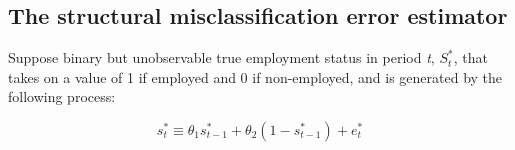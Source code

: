 \documentclass[letterpaper,12pt,final,dvipsnames]{article}
\begin{document}




\subsection{The structural misclassification error estimator}

Suppose binary but unobservable true employment status in period \textit{t}, $S_t^*$, that takes on a value of 1 if employed and 0 if non-employed, and is generated by the following process:



\begin{equation} 
s_t^* \equiv \theta_1 s_{t-1}^* + \theta_2 (1-s_{t-1}^*)+e_t^*
\end{equation}
\end{document}
